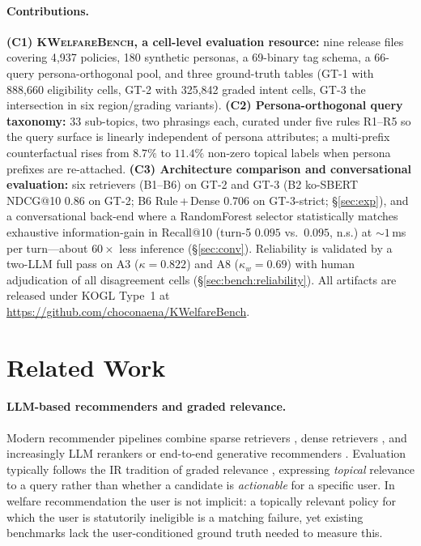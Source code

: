 \documentclass{article}
\newcommand{\kwbench}{\textsc{KWelfareBench}}
\newcommand{\npolicy}{4{,}937}
\newcommand{\npersona}{180}
\newcommand{\ndim}{69}
\begin{document}
\paragraph{Contributions.}
\textbf{(C1) \kwbench{}, a cell-level evaluation resource:} nine
release files covering \npolicy{} policies, \npersona{} synthetic
personas, a \ndim{}-binary tag schema, a 66-query persona-orthogonal
pool, and three ground-truth tables (GT-1 with 888{,}660 eligibility
cells, GT-2 with 325{,}842 graded intent cells, GT-3 the
intersection in six region/grading variants).
\textbf{(C2) Persona-orthogonal query taxonomy:} 33 sub-topics, two
phrasings each, curated under five rules R1--R5 so the query surface
is linearly independent of persona attributes; a multi-prefix
counterfactual rises from $8.7\%$ to $11.4\%$ non-zero topical
labels when persona prefixes are re-attached.
\textbf{(C3) Architecture comparison and conversational evaluation:}
six retrievers (B1--B6) on GT-2 and GT-3 (B2 ko-SBERT NDCG@10
$0.86$ on GT-2; B6 Rule\,+\,Dense $0.706$ on GT-3-strict;
\S\ref{sec:exp}), and a conversational back-end where a RandomForest
selector statistically matches exhaustive information-gain in
Recall@10 (turn-5 $0.095$ vs.\ $0.095$, n.s.) at ${\sim}1$\,ms per
turn---about $60\times$ less inference (\S\ref{sec:conv}). Reliability is validated
by a two-LLM full pass on A3 ($\kappa{=}0.822$) and A8
($\kappa_w{=}0.69$) with human adjudication of all disagreement
cells (\S\ref{sec:bench:reliability}). All artifacts are released
under KOGL Type~1 at
\url{https://github.com/choconaena/KWelfareBench}.

\section{Related Work}
\label{sec:related}

\paragraph{LLM-based recommenders and graded relevance.}
Modern recommender pipelines combine sparse retrievers
\citep{robertson2009bm25}, dense retrievers
\citep{karpukhin2020dpr,lewis2020rag}, and increasingly LLM rerankers
or end-to-end generative recommenders \citep{gao_2024_rag_survey}.
Evaluation typically follows the IR tradition of graded relevance
\citep{thakur2021beir}, expressing \emph{topical} relevance to a
query rather than whether a candidate is \emph{actionable} for a
specific user. In welfare recommendation the user is not implicit:
a topically relevant policy for which the user is statutorily
ineligible is a matching failure, yet existing benchmarks lack
the user-conditioned ground truth needed to measure this.
\end{document}
